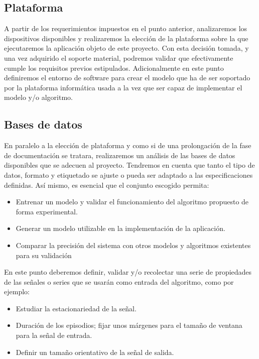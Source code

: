 \subsection{Plataforma}
A partir de los requerimientos impuestos en el punto anterior, analizaremos los dispositivos disponibles y realizaremos la elección de la plataforma sobre la que ejecutaremos la aplicación objeto de este proyecto. Con esta decisión tomada, y una vez adquirido el soporte material, podremos validar que efectivamente cumple los requisitos previos estipulados. Adicionalmente en este punto definiremos el entorno de software para crear el modelo que ha de ser soportado por la plataforma informática usada a la vez que ser capaz de implementar el modelo y/o algoritmo.


\subsection{Bases de datos}
En paralelo a la elección de plataforma y como si de una prolongación de la fase de documentación se tratara, realizaremos un análisis de las bases de datos disponibles que se adecuen al proyecto. Tendremos en cuenta que tanto el tipo de datos, formato y etiquetado se ajuste o pueda ser adaptado a las especificaciones definidas. Así mismo, es esencial que el conjunto escogido permita:
\begin{itemize}
  \item Entrenar un modelo y validar el funcionamiento del algoritmo propuesto de forma experimental.
  \item Generar un modelo utilizable en la implementación de la aplicación.
  \item Comparar la precisión del sistema con otros modelos y algoritmos existentes para su validación
\end{itemize}
En este punto deberemos definir, validar y/o recolectar una serie de propiedades de las señales o series que se usarán como entrada del algoritmo, como por ejemplo:
\begin{itemize}
  \item Estudiar la estacionariedad de la señal.
  \item Duración de los episodios; fijar unos márgenes para el tamaño de ventana para la señal de entrada.
  \item Definir un tamaño orientativo de la señal de salida.
\end{itemize}

